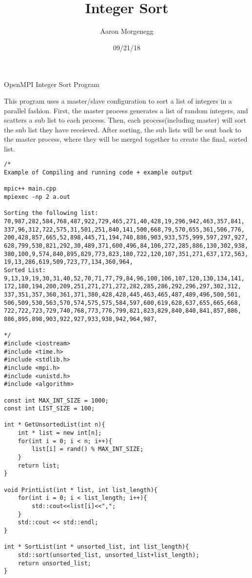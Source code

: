 \documentclass[12pt]{article}
\title{Integer Sort}
\author{Aaron Morgenegg}
\date{09/21/18}
\begin{document}
\maketitle

OpenMPI Integer Sort Program

This program uses a master/slave configuration to sort a list of integers in a parallel fashion. First, the master process generates a list of random integers, and scatters a sub list to each process. Then, each process(including master) will sort the sub list they have receieved. After sorting, the sub lists will be sent back to the master process, where they will be merged together to create the final, sorted list.

\begin{verbatim}
/*
Example of Compiling and running code + example output

mpic++ main.cpp
mpiexec -np 2 a.out

Sorting the following list: 
70,987,282,584,768,487,922,729,465,271,40,428,19,296,942,463,357,841,
337,96,312,722,575,31,501,251,840,141,500,668,79,570,655,361,506,776,
200,428,857,665,52,898,445,71,194,740,886,903,933,575,999,597,297,927,
628,799,530,821,292,30,489,371,600,496,84,106,272,285,886,130,302,938,
380,100,9,574,840,895,829,773,823,180,722,120,107,351,271,637,172,563,
19,13,286,619,509,723,77,134,360,964,
Sorted List: 
9,13,19,19,30,31,40,52,70,71,77,79,84,96,100,106,107,120,130,134,141,
172,180,194,200,209,251,271,271,272,282,285,286,292,296,297,302,312,
337,351,357,360,361,371,380,428,428,445,463,465,487,489,496,500,501,
506,509,530,563,570,574,575,575,584,597,600,619,628,637,655,665,668,
722,722,723,729,740,768,773,776,799,821,823,829,840,840,841,857,886,
886,895,898,903,922,927,933,938,942,964,987,

*/
#include <iostream>
#include <time.h>
#include <stdlib.h>
#include <mpi.h>
#include <unistd.h>
#include <algorithm>

const int MAX_INT_SIZE = 1000;
const int LIST_SIZE = 100;

int * GetUnsortedList(int n){
	int * list = new int[n];
	for(int i = 0; i < n; i++){
		list[i] = rand() % MAX_INT_SIZE;
	}
	return list;
}

void PrintList(int * list, int list_length){
	for(int i = 0; i < list_length; i++){
		std::cout<<list[i]<<",";
	}
	std::cout << std::endl;
}

int * SortList(int * unsorted_list, int list_length){
	std::sort(unsorted_list, unsorted_list+list_length);
	return unsorted_list;
}


\end{verbatim}
\end{document}
